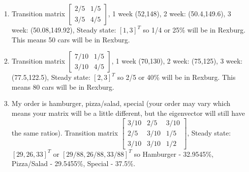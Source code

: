 \documentclass[10pt]{amsart}
\begin{document}
\begin{multicols}{2}
\begin{enumerate}
\item 
Transition matrix 
$\begin{bmatrix}
 {2}/{5} & {1}/{5} \\
 {3}/{5} & {4}/{5}
\end{bmatrix}$,
1 week  (52,148), 
2 week: (50.4,149.6),
3 week: (50.08,149.92),
Steady state: $[1,3]^T$ so 1/4 or 25\% will be in Rexburg. This means 50 cars will be in Rexburg. 

\item 
Transition matrix 
$\begin{bmatrix}
 {7}/{10} & {1}/{5} \\
 {3}/{10} & {4}/{5}
\end{bmatrix}$,
1 week  (70,130), 
2 week: (75,125),
3 week: (77.5,122.5),
Steady state: $[2,3]^T$ so 2/5 or 40\% will be in Rexburg. This means 80 cars will be in Rexburg. 

\item My order is hamburger, pizza/salad, special (your order may vary which means your matrix will be a little different, but the eigenvector will still have the same ratios).
Transition matrix 
$\begin{bmatrix}
 {3}/{10} & {2}/{5} & {3}/{10} \\
 {2}/{5} & {3}/{10} & {1}/{5} \\
 {3}/{10} & {3}/{10} & {1}/{2}
\end{bmatrix}$,
Steady state: $[29,26,33]^T$ or $[29/88,26/88,33/88]^T$ so Hamburger - 32.9545\%, Pizza/Salad - 29.5455\%, Special - 37.5\%. 
















\end{enumerate}
\end{multicols}
\end{document}
